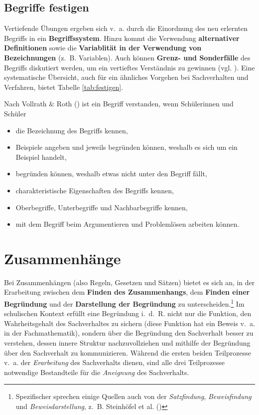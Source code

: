 \documentclass[
]{scrbook}
\providecommand{\tightlist}{%
  \setlength{\itemsep}{0pt}\setlength{\parskip}{0pt}}
\theoremstyle{definition}
\theoremstyle{definition}
\theoremstyle{definition}
\theoremstyle{definition}
\theoremstyle{remark}
\begin{document}
\subsection{Begriffe festigen}\label{begriffe-festigen}

Vertiefende Übungen ergeben sich v.~a. durch die Einordnung des neu erlernten Begriffs in ein \textbf{Begriffssystem}. Hinzu kommt die Verwendung \textbf{alternativer Definitionen} sowie die \textbf{Variablität in der Verwendung von Bezeichnungen} (z.~B. Variablen). Auch können \textbf{Grenz- und Sonderfälle} des Begriffs diskutiert werden, um ein vertieftes Verständnis zu gewinnen (vgl. ). Eine systematische Übersicht, auch für ein ähnliches Vorgehen bei Sachverhalten und Verfahren, bietet Tabelle \ref{tab:festigen}.

Nach Vollrath \& Roth () ist ein Begriff verstanden, wenn Schülerinnen und Schüler

\begin{itemize}
\tightlist
\item
  die Bezeichnung des Begriffs kennen,
\item
  Beispiele angeben und jeweils begründen können, weshalb es sich um ein Beispiel handelt,
\item
  begründen können, weshalb etwas nicht unter den Begriff fällt,
\item
  charakteristische Eigenschaften des Begriffs kennen,
\item
  Oberbegriffe, Unterbegriffe und Nachbarbegriffe kennen,
\item
  mit dem Begriff beim Argumentieren und Problemlösen arbeiten können.
\end{itemize}

\section{Zusammenhänge}\label{zusammenhuxe4nge}

Bei Zusammenhängen (also Regeln, Gesetzen und Sätzen) bietet es sich an, in der Erarbeitung zwischen dem \textbf{Finden des Zusammenhangs}, dem \textbf{Finden einer Begründung} und der \textbf{Darstellung der Begründung} zu unterscheiden.\footnote{Spezifischer sprechen einige Quellen auch von der \emph{Satzfindung}, \emph{Beweisfindung} und \emph{Beweisdarstellung}, z.~B. Steinhöfel et al. ()}
Im schulischen Kontext erfüllt eine Begründung i.~d.~R. nicht nur die Funktion, den Wahrheitsgehalt des Sachverhaltes zu sichern (diese Funktion hat ein Beweis v.~a. in der Fachmathematik), sondern über die Begründung den Sachverhalt besser zu verstehen, dessen innere Struktur nachzuvollziehen und mithilfe der Begründung über den Sachverhalt zu kommunizieren.
Während die ersten beiden Teilprozesse v.~a. der \emph{Erarbeitung} des Sachverhalts dienen, sind alle drei Teilprozesse notwendige Bestandteile für die \emph{Aneignung} des Sachverhalts.
\end{document}
